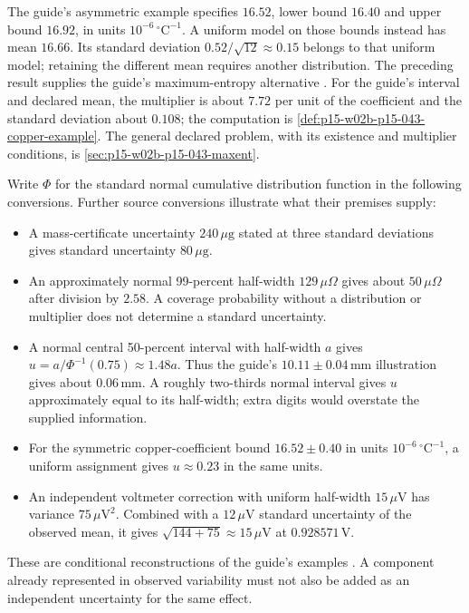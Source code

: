 The guide's asymmetric example specifies \(16.52\), lower bound \(16.40\)
and upper bound \(16.92\), in units \(10^{-6}\,{}^\circ\mathrm C^{-1}\).
A uniform model on those bounds instead has mean \(16.66\).
Its standard deviation \(0.52/\sqrt{12}\approx0.15\) belongs to that
uniform model; retaining the different mean requires another distribution.
The preceding result supplies the guide's maximum-entropy alternative
\cite[4.3.8 and its notes]{JCGM1002008EMeasurement}.
For the guide's interval and declared mean, the multiplier is about
\(7.72\) per unit of the coefficient and the standard deviation about
\(0.108\); the computation is \cref{def:p15-w02b-p15-043-copper-example}.
The general declared problem, with its existence and multiplier conditions,
is \cref{sec:p15-w02b-p15-043-maxent}.

Write \(\Phi\) for the standard normal cumulative distribution function
in the following conversions. Further source conversions illustrate what
their premises supply:
\begin{itemize}
\item A mass-certificate uncertainty \(240\,\mu\mathrm g\) stated at three
standard deviations gives standard uncertainty \(80\,\mu\mathrm g\).
\item An approximately normal 99-percent half-width \(129\,\mu\Omega\)
gives about \(50\,\mu\Omega\) after division by \(2.58\).
A coverage probability without a distribution or multiplier does not
determine a standard uncertainty.
\item A normal central 50-percent interval with half-width \(a\) gives
\(u=a/\Phi^{-1}(0.75)\approx1.48a\). Thus the guide's
\(10.11\pm0.04\,\mathrm{mm}\) illustration gives about \(0.06\,\mathrm{mm}\).
A roughly two-thirds normal interval gives \(u\) approximately equal to its
half-width; extra digits would overstate the supplied information.
\item For the symmetric copper-coefficient bound
\(16.52\pm0.40\) in units \(10^{-6}\,{}^\circ\mathrm C^{-1}\),
a uniform assignment gives \(u\approx0.23\) in the same units.
\item An independent voltmeter correction with uniform half-width
\(15\,\mu\mathrm V\) has variance \(75\,\mu\mathrm V^2\).
Combined with a \(12\,\mu\mathrm V\) standard uncertainty of the observed
mean, it gives \(\sqrt{144+75}\approx15\,\mu\mathrm V\) at
\(0.928571\,\mathrm V\).
\end{itemize}
These are conditional reconstructions of the guide's examples
\cite[4.3.3--4.3.9, 5.1.5]{JCGM1002008EMeasurement}.
A component already represented in observed variability must not also be
added as an independent uncertainty for the same effect.

